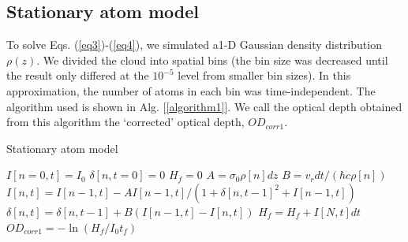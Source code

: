 \documentclass[12pt]{iopart}
\begin{document}
\subsection{Stationary atom model}
To solve Eqs. (\ref{eq3})-(\ref{eq4}), we simulated a1-D Gaussian density distribution $\rho(z)$. We divided the cloud into spatial bins (the bin size was decreased until the result only differed at the $10^{-5}$ level from smaller bin sizes).  In this approximation, the number of atoms in each bin was time-independent.  The algorithm used is shown in Alg. [\ref{algorithm1}]. We call the optical depth obtained from this algorithm the `corrected' optical depth, $OD_{corr1}$.

\begin{algorithm}
\caption{Stationary atom model}
\label{algorithm1}
\begin{algorithmic}
\STATE $I[n=0,t]=I_0$  
\STATE $\delta[n, t=0]=0$ 
\STATE $H_f=0$ 
 \STATE $A=\sigma_0\rho[n] dz$ 
 \STATE $B=v_r dt/(\hbar c \rho[n])$  
\STATE $I[n,t]=I[n-1,t] - A I[n-1,t]/(1+\delta[n,t-1]^2+I[n-1,t])$  
\STATE $\delta[n,t]=\delta[n,t-1]+B\left(I[n-1,t]-I[n,t]\right)$   
\ENDFOR 
\STATE $H_f =H_f+ I[N,t]dt$ 
\ENDFOR
\STATE $OD_{corr1}=-\ln{(H_f/I_0t_f)}$
\end{algorithmic}
\end{algorithm}
\end{document}

